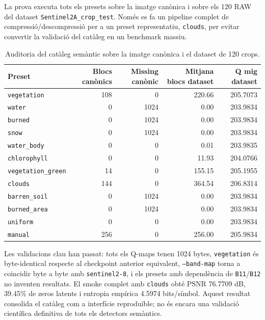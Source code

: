 \documentclass[11pt,a4paper]{article}
\begin{document}
La prova executa tots els presets sobre la imatge canònica i sobre els 120 RAW del dataset \texttt{Sentinel2A\_crop\_test}. Només es fa un pipeline complet de compressió/descompressió per a un preset representatiu, \texttt{clouds}, per evitar convertir la validació del catàleg en un benchmark massiu.

\begin{table}[H]
\centering
\begin{tabular}{lrrrr}
\toprule
\textbf{Preset} & \textbf{Blocs canònics} & \textbf{Missing canònic} & \textbf{Mitjana blocs dataset} & \textbf{Q mig dataset} \\
\midrule
\texttt{vegetation} & 108 & 0 & 220.66 & 205.7073 \\
\texttt{water} & 0 & 1024 & 0.00 & 203.9834 \\
\texttt{burned} & 0 & 1024 & 0.00 & 203.9834 \\
\texttt{snow} & 0 & 1024 & 0.00 & 203.9834 \\
\texttt{water\_body} & 0 & 0 & 0.01 & 203.9835 \\
\texttt{chlorophyll} & 0 & 0 & 11.93 & 204.0766 \\
\texttt{vegetation\_green} & 14 & 0 & 155.15 & 205.1955 \\
\texttt{clouds} & 144 & 0 & 364.54 & 206.8314 \\
\texttt{barren\_soil} & 0 & 1024 & 0.00 & 203.9834 \\
\texttt{burned\_area} & 0 & 1024 & 0.00 & 203.9834 \\
\texttt{uniform} & 0 & 0 & 0.00 & 203.9834 \\
\texttt{manual} & 256 & 0 & 256.00 & 205.9834 \\
\bottomrule
\end{tabular}
\caption{Auditoria del catàleg semàntic sobre la imatge canònica i el dataset de 120 crops.}
\end{table}

Les validacions clau han passat: tots els Q-maps tenen 1024 bytes, \texttt{vegetation} és byte-identical respecte al checkpoint anterior equivalent, \texttt{--band-map} torna a coincidir byte a byte amb \texttt{sentinel2-8}, i els presets amb dependència de \texttt{B11}/\texttt{B12} no inventen resultats. El smoke complet amb \texttt{clouds} obté PSNR 76.7709 dB, 39.45\% de zeros latents i entropia empírica 4.5974 bits/símbol. Aquest resultat consolida el catàleg com a interfície reproduïble; no és encara una validació científica definitiva de tots els detectors semàntics.
\end{document}
